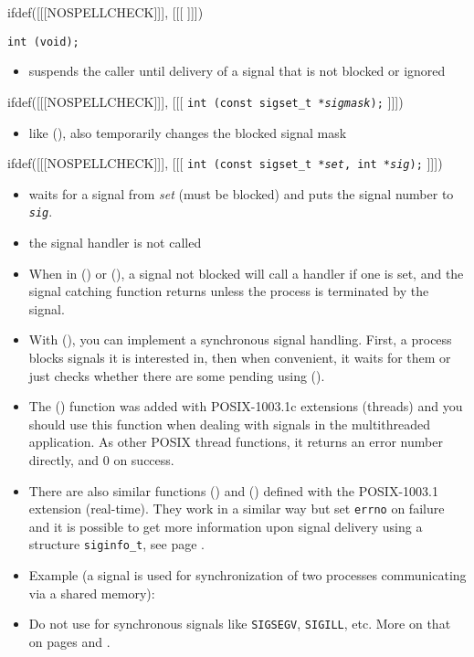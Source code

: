
\label{SIGWAIT}
ifdef([[[NOSPELLCHECK]]], [[[
]]])

\begin{slide}
\texttt{int (void);}
\begin{itemize}
\item suspends the caller until delivery of a signal that is not blocked or
ignored
\end{itemize}
ifdef([[[NOSPELLCHECK]]], [[[
\texttt{int (const sigset\_t *\emph{sigmask});}
]]])
\begin{itemize}
\item like (), also temporarily changes the blocked signal mask
\end{itemize}
ifdef([[[NOSPELLCHECK]]], [[[
\texttt{int (const sigset\_t *\emph{set}, int *\emph{sig});}
]]])
\begin{itemize}
\item waits for a signal from \emph{set} (must be blocked) and puts the signal
number to \emph{\texttt{sig}}.
\item the signal handler is not called
\end{itemize}
\end{slide}

\begin{itemize}
\item When in () or (), a signal not blocked will
call a handler if one is set, and the signal catching function returns unless
the process is terminated by the signal.
\item With (), you can implement a synchronous signal
handling.  First, a process blocks signals it is interested in, then when
convenient, it waits for them or just checks whether there are some pending
using ().
\item The () function was added with POSIX-1003.1c
extensions (threads) and you should use this function when dealing with signals
in the multithreaded application.  As other POSIX thread functions, it returns
an error number directly, and 0 on success.
\item \label{SIGWAITINFO} There are also similar functions ()
and () defined with the POSIX-1003.1 extension
(real-time).  They work in a similar way but set \texttt{errno} on failure and
it is possible to get more information upon signal delivery using a structure
\texttt{siginfo\_t}, see page \pageref{REALTIMEEXTENSIONS}.
\item Example (a signal is used for synchronization of two processes
communicating via a shared memory): 
\item Do not use for synchronous signals like \texttt{SIGSEGV}, \texttt{SIGILL},
etc.  More on that on pages \pageref{SPECIALSIGNALS} and
\pageref{THREADS_SIGWAIT}.
\end{itemize}

\endinput

